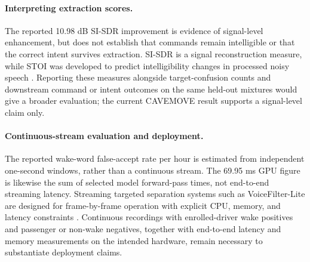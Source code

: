 \paragraph{Interpreting extraction scores.}
The reported 10.98 dB SI-SDR improvement is evidence of signal-level enhancement, but does not establish that commands remain intelligible or that the correct intent survives extraction. SI-SDR is a signal reconstruction measure, while STOI was developed to predict intelligibility changes in processed noisy speech \cite{leroux2019sdr,taal2011stoi}. Reporting these measures alongside target-confusion counts and downstream command or intent outcomes on the same held-out mixtures would give a broader evaluation; the current CAVEMOVE result supports a signal-level claim only.

\paragraph{Continuous-stream evaluation and deployment.}
The reported wake-word false-accept rate per hour is estimated from independent one-second windows, rather than a continuous stream. The 69.95 ms GPU figure is likewise the sum of selected model forward-pass times, not end-to-end streaming latency. Streaming targeted separation systems such as VoiceFilter-Lite are designed for frame-by-frame operation with explicit CPU, memory, and latency constraints \cite{voicefilterlite}. Continuous recordings with enrolled-driver wake positives and passenger or non-wake negatives, together with end-to-end latency and memory measurements on the intended hardware, remain necessary to substantiate deployment claims.
